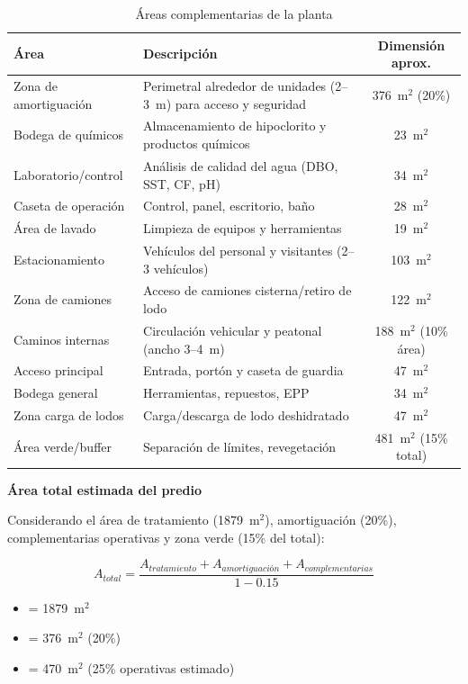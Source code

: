 \documentclass[12pt,a4paper]{article}
\begin{document}
\begin{table}[H]
\centering
\caption{Áreas complementarias de la planta}
\small
\begin{tabular}{lp{8cm}c}
\toprule
Área & Descripción & Dimensión aprox. \\
\midrule
Zona de amortiguación & Perimetral alrededor de unidades (2--3~m) para acceso y seguridad & 376~m$^2$ (20\%) \\
\addlinespace
Bodega de químicos & Almacenamiento de hipoclorito y productos químicos & 23~m$^2$ \\
\addlinespace
Laboratorio/control & Análisis de calidad del agua (DBO, SST, CF, pH) & 34~m$^2$ \\
\addlinespace
Caseta de operación & Control, panel, escritorio, baño & 28~m$^2$ \\
\addlinespace
Área de lavado & Limpieza de equipos y herramientas & 19~m$^2$ \\
\addlinespace
Estacionamiento & Vehículos del personal y visitantes (2--3 vehículos) & 103~m$^2$ \\
\addlinespace
Zona de camiones & Acceso de camiones cisterna/retiro de lodo & 122~m$^2$ \\
\addlinespace
Caminos internas & Circulación vehicular y peatonal (ancho 3--4~m) & 188~m$^2$ (10\% área) \\
\addlinespace
Acceso principal & Entrada, portón y caseta de guardia & 47~m$^2$ \\
\addlinespace
Bodega general & Herramientas, repuestos, EPP & 34~m$^2$ \\
\addlinespace
Zona carga de lodos & Carga/descarga de lodo deshidratado & 47~m$^2$ \\
\addlinespace
Área verde/buffer & Separación de límites, revegetación & 481~m$^2$ (15\% total) \\
\bottomrule
\end{tabular}
\end{table}

\textbf{Área total estimada del predio}

Considerando el área de tratamiento (1879~m$^2$), amortiguación (20\%), complementarias operativas y zona verde (15\% del total):

\begin{equation}
A_{total} = \frac{A_{tratamiento} + A_{amortiguación} + A_{complementarias}}{1 - 0.15}
\end{equation}

\begin{itemize}[noitemsep,leftmargin=2em]
    \item[$A_{tratamiento}$] = 1879~m$^2$
    \item[$A_{amortiguación}$] = 376~m$^2$ (20\%)
    \item[$A_{complementarias}$] = 470~m$^2$ (25\% operativas estimado)
\end{itemize}
\end{document}

